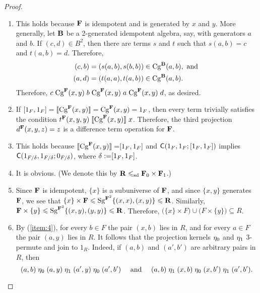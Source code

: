 \pagebreak  

\begin{proof}\
  \begin{enumerate}
  \item 
  This holds because $\mathbf{F}$ is idempotent and is generated by $x$ and $y$.
  More generally, let $\mathbf{B}$ be a 2-generated idempotent algebra, say, with
  generators $a$ and $b$.  If $(c,d) \in B^2$, then there are terms $s$ and $t$
  such that $s(a,b) = c$ and $t(a,b) = d$.  Therefore, 
  \begin{align*}
    (c,b) &= (s(a,b), s(b,b)) \in \operatorname{Cg}^{\mathbf{B}}(a,b), \text{ and }\\
    (a,d) &= (t(a,a), t(a,b)) \in \operatorname{Cg}^{\mathbf{B}}(a,b).
  \end{align*}
  Therefore, 
  $c \mathrel{\operatorname{Cg}^{\mathbf{F}}(x,y)} b\mathrel{\operatorname{Cg}^{\mathbf{F}}(x,y)} a \mathrel{\operatorname{Cg}^{\mathbf{F}}(x,y)} d$,
  as desired.

  \item If $[1_F,1_F] = \llbracket \operatorname{Cg}^{\mathbf{F}}(x,y) \rrbracket = \operatorname{Cg}^{\mathbf{F}}(x,y) = 1_F$, then every term
  trivially satisfies the condition
  $t^{\mathbf{F}}(x,y,y) \mathrel{\llbracket \operatorname{Cg}^{\mathbf{F}}(x,y) \rrbracket} x$.  Therefore, the third projection
  $d^{\mathbf{F}}(x,y,z) = z$ is a difference term operation for $\mathbf{F}$.

\item  This holds because %
  $\llbracket \operatorname{Cg}^{\mathbf{F}}(x,y) \rrbracket = \mathrel{[1_F, 1_F]}$ and $\mathsf{C}(1_F, 1_F; \mathrel{[1_F, 1_F]})$
  implies $\mathsf{C}(1_{F/\delta}, 1_{F/\delta}; 0_{F/\delta})$, where
  $\delta := \mathrel{[1_F, 1_F]}$.

\item It is obvious. 
(We denote this by $\mathbf{R} \leqslant_{\mathrm{sd}} \mathbf{F}_0 \times \mathbf{F}_1$.)


\item
  Since $\mathbf{F}$ is idempotent, $\{x\}$ is a subuniverse of $\mathbf{F}$, and since
  $\{x, y\}$ generates $\mathbf{F}$, we see that
  $\{x\} \times \mathbf{F} \leqslant \operatorname{Sg}^{\mathbf{F}^2}\{(x,x), (x,y)\}\leqslant \mathbf{R}$.
  Similarly, $\mathbf{F}\times \{y\} \leqslant \operatorname{Sg}^{\mathbf{F}^2}\{(x,y), (y,y)\}\leqslant \mathbf{R}$.
  Therefore,
  $\bigl(\{x\} \times F\bigr) \cup \bigl(F \times \{y\}\bigr) \subseteq R$.


\item By (\ref{item:4}), for every $b \in F$ the pair $(x,b)$ lies in $R$, and for every
  $a\in F$ the pair $(a,y)$ lies in $R$.
  It follows that the projection kernels $\eta_0$ and $\eta_1$ 3-permute and
  join to $1_R$.
  Indeed, if $(a,b)$ and $(a',b')$ are arbitrary pairs in $R$, then
  \[ (a,b) \mathrel{\eta_0} (a,y) \mathrel{\eta_1} (a',y) \mathrel{\eta_0}
    (a',b') \quad \text{ and } \quad 
  (a,b) \mathrel{\eta_1} (x,b) \mathrel{\eta_0} (x,b') \mathrel{\eta_1} (a',b'). \]
  \end{enumerate}
\end{proof}


